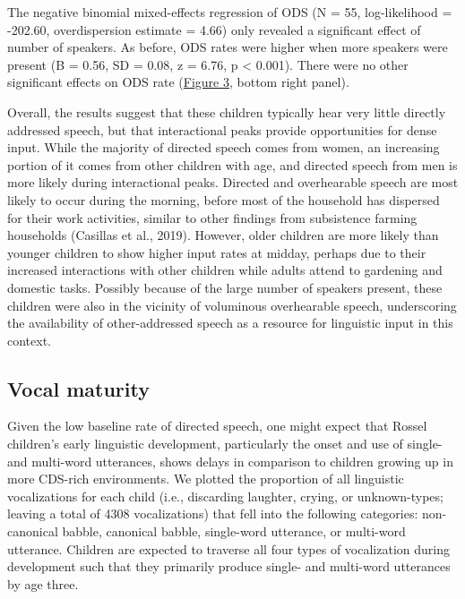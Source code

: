 \documentclass[,man,floatsintext]{apa6}
\begin{document}
The negative binomial mixed-effects regression of ODS (N = 55,
log-likelihood = -202.60, overdispersion estimate = 4.66) only revealed
a significant effect of number of speakers. As before, ODS rates were
higher when more speakers were present (B = 0.56, SD = 0.08, z = 6.76, p
\textless{} 0.001). There were no other significant effects on ODS rate
(\protect\hyperlink{fig3}{Figure 3}, bottom right panel).

Overall, the results suggest that these children typically hear very
little directly addressed speech, but that interactional peaks provide
opportunities for dense input. While the majority of directed speech
comes from women, an increasing portion of it comes from other children
with age, and directed speech from men is more likely during
interactional peaks. Directed and overhearable speech are most likely to
occur during the morning, before most of the household has dispersed for
their work activities, similar to other findings from subsistence
farming households (Casillas et al., 2019). However, older children are
more likely than younger children to show higher input rates at midday,
perhaps due to their increased interactions with other children while
adults attend to gardening and domestic tasks. Possibly because of the
large number of speakers present, these children were also in the
vicinity of voluminous overhearable speech, underscoring the
availability of other-addressed speech as a resource for linguistic
input in this context.

\subsection{Vocal maturity}\label{vocal-maturity}

Given the low baseline rate of directed speech, one might expect that
Rossel children's early linguistic development, particularly the onset
and use of single- and multi-word utterances, shows delays in comparison
to children growing up in more CDS-rich environments. We plotted the
proportion of all linguistic vocalizations for each child (i.e.,
discarding laughter, crying, or unknown-types; leaving a total of 4308
vocalizations) that fell into the following categories: non-canonical
babble, canonical babble, single-word utterance, or multi-word
utterance. Children are expected to traverse all four types of
vocalization during development such that they primarily produce single-
and multi-word utterances by age three.
\end{document}
